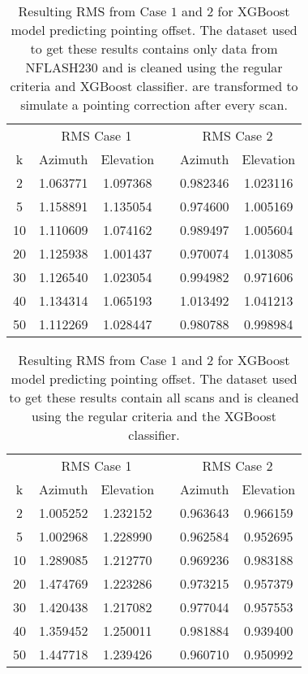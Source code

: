 \begin{table}[h]
    \centering %
    \caption{Resulting RMS from Case $1$ and $2$ for XGBoost model predicting pointing offset.
    The dataset used to get these results contains only data from NFLASH230 and is cleaned using the regular criteria and XGBoost classifier.
    are transformed to simulate a pointing correction after every scan.}
    \begin{tabular}{ccc c cc}
        \toprule
        \multicolumn{1}{c}{} & \multicolumn{2}{c}{RMS Case 1} & & \multicolumn{2}{c}{RMS Case 2} \\
        \cmidrule(lr){2-3} \cmidrule(lr){5-6}
        k & Azimuth & Elevation & & Azimuth & Elevation \\
        \midrule
        2 &  1.063771 &  1.097368 & &  0.982346 &  1.023116 \\
        5 &  1.158891 &  1.135054 & &  0.974600 &  1.005169 \\
       10 &  1.110609 &  1.074162 & &  0.989497 &  1.005604 \\
       20 &  1.125938 &  1.001437 & &  0.970074 &  1.013085 \\
       30 &  1.126540 &  1.023054 & &  0.994982 &  0.971606 \\
       40 &  1.134314 &  1.065193 & &  1.013492 &  1.041213 \\
       50 &  1.112269 &  1.028447 & &  0.980788 &  0.998984 \\
       \bottomrule
        \bottomrule
    \end{tabular}
\end{table}

\begin{table}[h]
    \centering %
    \caption{Resulting RMS from Case $1$ and $2$ for XGBoost model predicting pointing offset.
    The dataset used to get these results contain all scans and is cleaned using the regular criteria and the XGBoost classifier.}
    \begin{tabular}{ccc c cc}
        \toprule
        \multicolumn{1}{c}{} & \multicolumn{2}{c}{RMS Case 1} & & \multicolumn{2}{c}{RMS Case 2} \\
        \cmidrule(lr){2-3} \cmidrule(lr){5-6}
         k & Azimuth & Elevation & & Azimuth & Elevation \\
        \midrule
        2 &  1.005252 &  1.232152 & &  0.963643 &  0.966159 \\
        5 &  1.002968 &  1.228990 & &  0.962584 &  0.952695 \\
       10 &  1.289085 &  1.212770 & &  0.969236 &  0.983188 \\
       20 &  1.474769 &  1.223286 & &  0.973215 &  0.957379 \\
       30 &  1.420438 &  1.217082 & &  0.977044 &  0.957553 \\
       40 &  1.359452 &  1.250011 & &  0.981884 &  0.939400 \\
       50 &  1.447718 &  1.239426 & &  0.960710 &  0.950992 \\
        \bottomrule
    \end{tabular}
\end{table}


